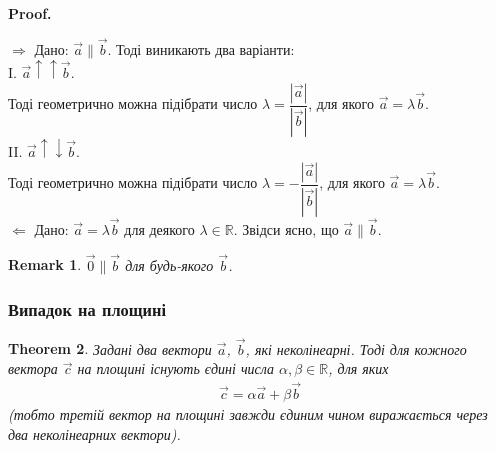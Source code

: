 \documentclass[a4paper, 10pt]{extarticle}
\makeatletter
\def\qed{$\blacksquare$}
\def\qed{$\blacksquare$}
\def\rightproof{$\boxed{\Rightarrow}$ }
\def\leftproof{$\boxed{\Leftarrow}$ }
\theoremstyle{theoremdd}
\newtheorem{theorem}{Theorem}[subsection]
\theoremstyle{theoremdd}
\theoremstyle{theoremdd}
\theoremstyle{theoremdd}
\theoremstyle{theoremdd}
\theoremstyle{theoremdd}
\newtheorem{remark}[theorem]{Remark}
\theoremstyle{theoremdd}
\theoremstyle{theoremdd}
\renewenvironment{proof}[1][Proof.\\]{\par
\pushQED{\hfill \qed}%
\normalfont \topsep6\p@\@plus6\p@\relax
\trivlist
\item\relax
{\bfseries
#1\@addpunct{.}}\hspace\labelsep\ignorespaces
}{%
\popQED\endtrivlist\@endpefalse
}
\makeatother
\begin{document}
\begin{proof}
\rightproof Дано: $\vec{a} \parallel \vec{b}$. Тоді виникають два варіанти:\\
I. $\vec{a} \uparrow \uparrow \vec{b}$.\\
Тоді геометрично можна підібрати число $\lambda = \dfrac{|\vec{a}|}{|\vec{b}|}$, для якого $\vec{a} = \lambda \vec{b}$.\\
II. $\vec{a} \uparrow \downarrow \vec{b}$.\\
Тоді геометрично можна підібрати число $\lambda = -\dfrac{|\vec{a}|}{|\vec{b}|}$, для якого $\vec{a} = \lambda \vec{b}$.
\bigskip \\
\leftproof Дано: $\vec{a} = \lambda \vec{b}$ для деякого $\lambda \in \mathbb{R}$. Звідси ясно, що $\vec{a} \parallel \vec{b}$.
\end{proof}

\begin{remark}
$\vec{0} \parallel \vec{b}$ для будь-якого $\vec{b}$.
\end{remark}

\subsubsection{Випадок на площині}
\begin{theorem}
\label{basis_on_plane}
Задані два вектори $\vec{a}$, $\vec{b}$, які неколінеарні. Тоді для кожного вектора $\vec{c}$ на площині існують єдині числа $\alpha, \beta \in \mathbb{R}$, для яких 
\begin{align*}
\vec{c} = \alpha \vec{a} + \beta \vec{b}
\end{align*}
(\textit{тобто третій вектор на площині завжди єдиним чином виражається через два неколінеарних вектори}).
\end{theorem}
\end{document}
